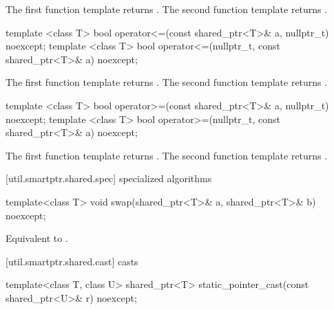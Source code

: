 \begin{itemdescr}
\pnum
\returns
The first function template returns .
The second function template returns .
\end{itemdescr}

%
%
\begin{itemdecl}
template <class T>
  bool operator<=(const shared_ptr<T>& a, nullptr_t) noexcept;
template <class T>
  bool operator<=(nullptr_t, const shared_ptr<T>& a) noexcept;
\end{itemdecl}

\begin{itemdescr}
\pnum
\returns
The first function template returns .
The second function template returns .
\end{itemdescr}

%
%
\begin{itemdecl}
template <class T>
  bool operator>=(const shared_ptr<T>& a, nullptr_t) noexcept;
template <class T>
  bool operator>=(nullptr_t, const shared_ptr<T>& a) noexcept;
\end{itemdecl}

\begin{itemdescr}
\pnum
\returns
The first function template returns .
The second function template returns .
\end{itemdescr}

[util.smartptr.shared.spec]{ specialized algorithms}

%
%
\begin{itemdecl}
template<class T> void swap(shared_ptr<T>& a, shared_ptr<T>& b) noexcept;
\end{itemdecl}

\begin{itemdescr}
\pnum\effects  Equivalent to .
\end{itemdescr}

[util.smartptr.shared.cast]{ casts}

%
%
\begin{itemdecl}
template<class T, class U> shared_ptr<T> static_pointer_cast(const shared_ptr<U>& r) noexcept;
\end{itemdecl}

